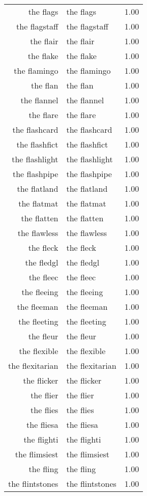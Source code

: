 \begin{table}[ht]
\begin{tabular}{rlr}
  the flags & the flags & 1.00 \\ 
  the flagstaff & the flagstaff & 1.00 \\ 
  the flair & the flair & 1.00 \\ 
  the flake & the flake & 1.00 \\ 
  the flamingo & the flamingo & 1.00 \\ 
  the flan & the flan & 1.00 \\ 
  the flannel & the flannel & 1.00 \\ 
  the flare & the flare & 1.00 \\ 
  the flashcard & the flashcard & 1.00 \\ 
  the flashfict & the flashfict & 1.00 \\ 
  the flashlight & the flashlight & 1.00 \\ 
  the flashpipe & the flashpipe & 1.00 \\ 
  the flatland & the flatland & 1.00 \\ 
  the flatmat & the flatmat & 1.00 \\ 
  the flatten & the flatten & 1.00 \\ 
  the flawless & the flawless & 1.00 \\ 
  the fleck & the fleck & 1.00 \\ 
  the fledgl & the fledgl & 1.00 \\ 
  the fleec & the fleec & 1.00 \\ 
  the fleeing & the fleeing & 1.00 \\ 
  the fleeman & the fleeman & 1.00 \\ 
  the fleeting & the fleeting & 1.00 \\ 
  the fleur & the fleur & 1.00 \\ 
  the flexible & the flexible & 1.00 \\ 
  the flexitarian & the flexitarian & 1.00 \\ 
  the flicker & the flicker & 1.00 \\ 
  the flier & the flier & 1.00 \\ 
  the flies & the flies & 1.00 \\ 
  the fliesa & the fliesa & 1.00 \\ 
  the flighti & the flighti & 1.00 \\ 
  the flimsiest & the flimsiest & 1.00 \\ 
  the fling & the fling & 1.00 \\ 
  the flintstones & the flintstones & 1.00 \\ 

\end{tabular}
\end{table}
